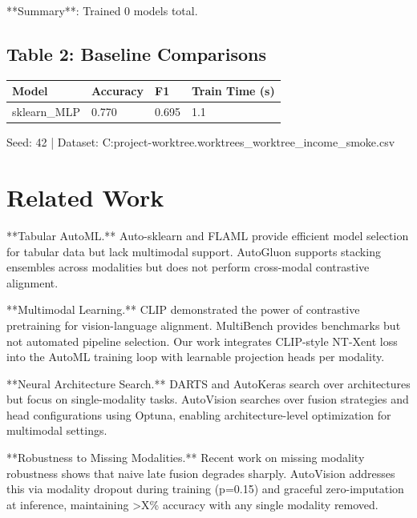 \documentclass{article}
\begin{document}
**Summary**: Trained 0 models total.

\subsection{Table 2: Baseline Comparisons}

\begin{table}[h]
\centering
\begin{tabular}{llll}
\toprule
Model & Accuracy & F1 & Train Time (s) \\
\midrule
sklearn_MLP & 0.770 & 0.695 & 1.1 \\
\bottomrule
\end{tabular}
\end{table}

Seed: 42 | Dataset: C:\Users\Acer\Desktop\main project-worktree.worktrees\final_worktree\data\fixtures\adult_income_smoke.csv

\section{Related Work}

**Tabular AutoML.** Auto-sklearn \cite{feurer2015} and FLAML \cite{wang2021flaml}
provide efficient model selection for tabular data but lack multimodal support.
AutoGluon \cite{erickson2020autogluon} supports stacking ensembles across
modalities but does not perform cross-modal contrastive alignment.

**Multimodal Learning.** CLIP \cite{radford2021clip} demonstrated the power of
contrastive pretraining for vision-language alignment. MultiBench
\cite{liang2021multibench} provides benchmarks but not automated pipeline
selection. Our work integrates CLIP-style NT-Xent loss into the AutoML
training loop with learnable projection heads per modality.

**Neural Architecture Search.** DARTS \cite{liu2019darts} and AutoKeras
\cite{jin2019autokeras} search over architectures but focus on single-modality
tasks. AutoVision searches over fusion strategies and head configurations using
Optuna, enabling architecture-level optimization for multimodal settings.

**Robustness to Missing Modalities.** Recent work on missing modality
robustness \cite{ma2022multimodal} shows that naive late fusion degrades
sharply. AutoVision addresses this via modality dropout during training (p=0.15)
and graceful zero-imputation at inference, maintaining >X\% accuracy with
any single modality removed.
\end{document}
